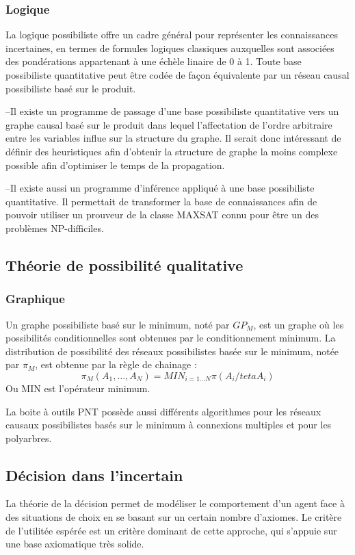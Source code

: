 \subsubsection{Logique}
La logique possibiliste offre un cadre général pour représenter les connaissances incertaines, en termes de formules logiques classiques auxquelles sont associées des pondérations appartenant à une échèle linaire de 0 à 1. Toute base possibiliste quantitative peut être codée de façon équivalente par un réseau causal possibiliste basé sur le produit.

–Il existe un programme de passage d’une base possibiliste quantitative vers un graphe causal basé sur le produit dans lequel l’affectation de l’ordre arbitraire entre les variables influe sur la structure du graphe. Il serait donc intéressant de définir des heuristiques afin d’obtenir la structure de graphe la moins complexe possible afin d’optimiser
le temps de la propagation.

–Il existe aussi un programme d’inférence appliqué à une base possibiliste quantitative. Il permettait de 	 transformer la base de connaissances afin de pouvoir utiliser un prouveur de la classe MAXSAT connu pour être un des problèmes NP-difficiles.\cite{hkhallafiThesis}

\subsection{Théorie de possibilité qualitative}
\subsubsection{Graphique}

Un graphe possibiliste basé sur le minimum, noté par $GP_{M}$, est un graphe où les possibilités conditionnelles sont obtenues par le conditionnement minimum. La distribution de possibilité des réseaux possibilistes basée sur le minimum, notée par $\pi_{M}$, est obtenue par la règle de chainage :
\begin{equation}
 \pi_{M} (A_1, \dots, A_N) = MIN_{i=1 \dots N} \pi (A_i/teta A_i) 
\end{equation}
Ou MIN est  l’opérateur minimum.\cite{BoBrDu2008.1}

La boite à outils PNT possède aussi différents algorithmes pour les réseaux causaux possibilistes basés sur le minimum à connexions multiples et pour les polyarbres. 

\subsection{Décision dans l’incertain}
La théorie de la décision permet de modéliser le comportement d'un agent face
à des situations de choix en se basant sur un certain nombre d'axiomes. Le critère
de l'utilitée espérée est un critère dominant de cette approche, qui s'appuie sur une
base axiomatique très solide.\cite{hkhaoulaThesis}
